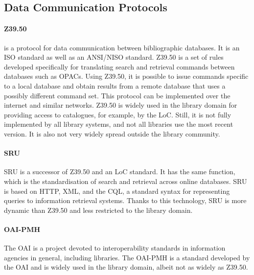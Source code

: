\subsection{Data Communication Protocols}
\label{subsec:data_comm_prot}

\paragraph{Z39.50}

is a protocol for data communication between bibliographic databases.
%
%
%
It is an \gls{ISO} standard as well as an \gls{ANSI}/\gls{NISO} standard.
%
Z39.50 is a set of rules developed specifically
for translating search and retrieval commands between databases such as OPACs.
Using Z39.50, it is possible to issue commands specific to a local database
and obtain results from a remote database that uses a possibly different command set.
This protocol can be implemented over the internet and similar networks.
Z39.50 is widely used in the library domain for providing access to catalogues,
for example, by the \gls{LoC}. Still, it is not fully implemented by all library systems,
and not all libraries use the most recent version. It is also not very widely spread
outside the library community.

\paragraph{SRU}

\gls{SRU} is a successor of \gls{Z39.50} and an \gls{LoC} standard.
It has the same function, which is the standardisation of search and retrieval
across online databases. 
SRU is based on \gls{HTTP}, \gls{XML}, and the \gls{CQL}, 
a standard syntax for representing queries to information retrieval systems.
Thanks to this technology, SRU is more dynamic than \gls{Z39.50}
and less restricted to the library domain.

\paragraph{OAI-PMH}

The \gls{OAI} is a project devoted to interoperability standards in information agencies
in general, including libraries.
The \gls{OAI-PMH} is a standard developed by the OAI
and is widely used in the library domain, albeit not as widely as \gls{Z39.50}.

